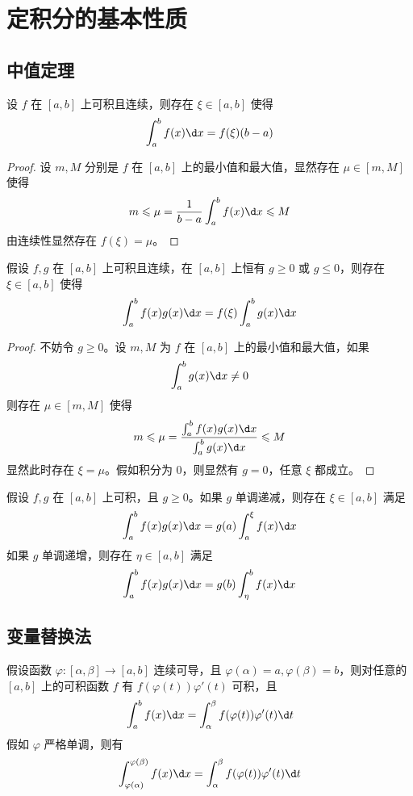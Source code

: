 \section{定积分的基本性质}

\subsection{中值定理}

\begin{theorem}[积分第一中值定理]
	设 $f$ 在 $[a,b]$ 上可积且连续，则存在 $\xi \in [a, b]$ 使得
	\[ \int_{a}^{b} f(x) \d x = f(\xi) (b-a) \]
\end{theorem}

\begin{proof}
	设 $m, M$ 分别是 $f$ 在 $[a,b]$ 上的最小值和最大值，显然存在 $\mu \in [m, M]$ 使得
	\[ m \leqslant \mu = \frac{1}{b-a}\int_{a}^{b} f(x) \d x \leqslant M \]
	由连续性显然存在 $f(\xi) = \mu$。
\end{proof}

\begin{theorem}[广义积分第一中值定理]
	假设 $f, g$ 在 $[a, b]$ 上可积且连续，在 $[a,b]$ 上恒有 $g \geqslant 0$ 或 $g \leqslant 0$，则存在 $\xi \in [a,b]$ 使得
	\[ \int_{a}^{b} f(x)g(x) \d x = f(\xi) \int_{a}^{b} g(x) \d x \]
\end{theorem}

\begin{proof}
	不妨令 $g \geqslant 0$。设 $m, M$ 为 $f$ 在 $[a, b]$ 上的最小值和最大值，如果
	\[ \int_{a}^{b} g(x) \d x \neq 0 \]
	则存在 $\mu \in [m, M]$ 使得
	\[ m \leqslant \mu = \frac{ \int_{a}^{b} f(x)g(x) \d x}{\int_{a}^{b} g(x) \d x} \leqslant M \]
	显然此时存在 $\xi = \mu$。假如积分为 $0$，则显然有 $g = 0$，任意 $\xi$ 都成立。
\end{proof}

\begin{theorem}[积分第二中值定理]
	假设 $f, g$ 在 $[a,b]$ 上可积，且 $g \geqslant 0$。如果 $g$ 单调递减，则存在 $\xi \in [a, b]$ 满足
	\[ \int_{a}^{b} f(x) g(x) \d x = g(a) \int_{a}^{\xi} f(x) \d x \]
	如果 $g$ 单调递增，则存在 $\eta \in [a, b]$ 满足
	\[ \int_{a}^{b} f(x) g(x) \d x = g(b) \int_{\eta}^{b} f(x) \d x \]
\end{theorem}

\subsection{变量替换法}

\begin{theorem}
	假设函数 $\varphi : [\alpha, \beta] \to [a, b]$ 连续可导，且 $\varphi(\alpha) = a, \varphi(\beta) = b$，则对任意的 $[a, b]$ 上的可积函数 $f$ 有 $f(\varphi(t))\varphi'(t)$ 可积，且
	\[ \int_{a}^{b} f(x) \d x = \int_{\alpha}^{\beta} f(\varphi(t)) \varphi'(t) \d t \]
	假如 $\varphi$ 严格单调，则有
	\[ \int_{\varphi(\alpha)}^{\varphi(\beta)} f(x) \d x = \int_{\alpha}^{\beta} f(\varphi(t)) \varphi'(t) \d t \]

\end{theorem}

